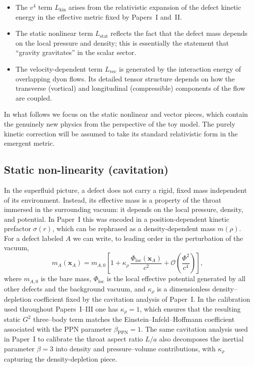\documentclass[11pt]{article}
\begin{document}
\begin{itemize}
  \item The $v^4$ term $L_{\text{kin}}$ arises from the relativistic
        expansion of the defect kinetic energy in the effective
        metric fixed by Papers~I and~II.
  \item The static nonlinear term $L_{\text{stat}}$ reflects the
        fact that the defect mass depends on the local pressure and
        density; this is essentially the statement that ``gravity
        gravitates'' in the scalar sector.
  \item The velocity-dependent term $L_{\text{vec}}$ is generated by
        the interaction energy of overlapping dyon flows.
        Its detailed tensor structure depends on how the transverse
        (vortical) and longitudinal (compressible) components of
        the flow are coupled.
\end{itemize}

In what follows we focus on the static nonlinear and vector pieces,
which contain the genuinely new physics from the perspective of the
toy model.  The purely kinetic correction will be assumed to take its
standard relativistic form in the emergent metric.

\subsection{Static non-linearity (cavitation)}
\label{subsec:nbody-static}

In the superfluid picture, a defect does not carry a rigid, fixed
mass independent of its environment.
Instead, its effective mass is a property of the throat immersed in
the surrounding vacuum: it depends on the local pressure, density,
and potential.
In Paper~I this was encoded in a position-dependent kinetic
prefactor $\sigma(r)$, which can be rephrased as a density-dependent
mass $m(\rho)$.
For a defect labeled $A$ we can write, to leading order in the
perturbation of the vacuum,
\begin{equation}
  m_A(\mathbf{x}_A)
  = m_{A,0}\left[
      1 + \kappa_\rho\,
          \frac{\Phi_{\text{loc}}(\mathbf{x}_A)}{c^2}
      + \mathcal{O}\!\left(\frac{\Phi^2}{c^4}\right)
    \right],
  \label{eq:mass-density-dep}
\end{equation}
where $m_{A,0}$ is the bare mass, $\Phi_{\text{loc}}$ is the local
effective potential generated by all other defects and the background
vacuum, and $\kappa_\rho$ is a dimensionless density–depletion
coefficient fixed by the cavitation analysis of Paper~I.
In the calibration used throughout Papers~I–III one has
$\kappa_\rho = 1$, which ensures that the resulting static $G^2$
three–body term matches the Einstein--Infeld--Hoffmann coefficient
associated with the PPN parameter $\beta_{\mathrm{PPN}}=1$.
The same cavitation analysis used in Paper~I to calibrate the throat
aspect ratio $L/a$ also decomposes the inertial parameter $\beta=3$
into density and pressure--volume contributions, with $\kappa_\rho$
capturing the density-depletion piece.
\end{document}
